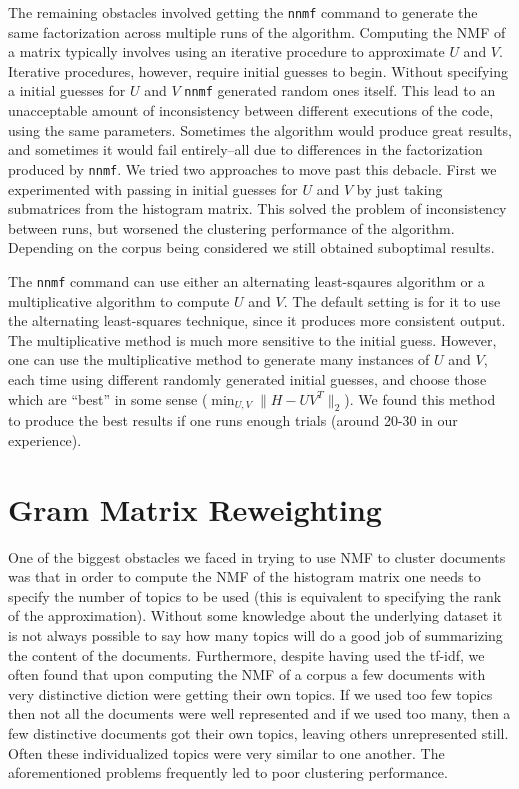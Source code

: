 \documentclass[fleqn,10pt]{../SelfArx} %
\begin{document}
The remaining obstacles involved getting the \texttt{nnmf} command to generate the same factorization across multiple runs of the algorithm. Computing the NMF of a matrix typically involves using an iterative procedure to approximate $U$ and $V$. Iterative procedures, however, require initial guesses to begin. Without specifying a initial guesses for $U$ and $V$ \texttt{nnmf} generated random ones itself. This lead to an unacceptable amount of inconsistency between different executions of the code, using the same parameters. Sometimes the algorithm would produce great results, and sometimes it would fail entirely--all due to differences in the factorization produced by \texttt{nnmf}. We tried two approaches to move past this debacle. First we experimented with passing in initial guesses for $U$ and $V$ by just taking submatrices from the histogram matrix. This solved the problem of inconsistency between runs, but worsened the clustering performance of the algorithm. Depending on the corpus being considered we still obtained suboptimal results.

The \texttt{nnmf} command can use either an alternating least-sqaures algorithm or a multiplicative algorithm to compute $U$ and $V$. The default setting is for it to use the alternating least-squares technique, since it produces more consistent output. The multiplicative method is much more sensitive to the initial guess. However, one can use the multiplicative method to generate many instances of $U$ and $V$, each time using different randomly generated initial guesses, and choose those which are ``best'' in some sense ($\min_{U,V}\|H-UV^T\|_2$). We found this method to produce the best results if one runs enough trials (around 20-30 in our experience).



\section{Gram Matrix Reweighting} %
\label{sec:gram}
One of the biggest obstacles we faced in trying to use NMF to cluster documents was that in order to compute the NMF of the histogram matrix one needs to specify the number of topics to be used (this is equivalent to specifying the rank of the approximation). Without some knowledge about the underlying dataset it is not always possible to say how many topics will do a good job of summarizing the content of the documents. Furthermore, despite having used the tf-idf, we often found that upon computing the NMF of a corpus a few documents with very distinctive diction were getting their own topics. If we used too few topics then not all the documents were well represented and if we used too many, then a few distinctive documents got their own topics, leaving others unrepresented still. Often these individualized topics were very similar to one another. The aforementioned problems frequently led to poor clustering performance.
\end{document}
